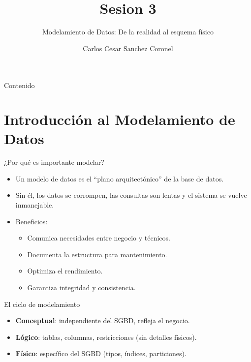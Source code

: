 \documentclass[aspectratio=169, 10pt, xcolor=table]{beamer}
\title[SESION 3 BBDD]{\textbf{Sesion 3}}
\subtitle{Modelamiento de Datos: De la realidad al esquema físico}
\author[Prof. C. Sanchez]{Carlos Cesar Sanchez Coronel}
\institute{\textbf{BASES DE DATOS}}
\date{}
\begin{document}
\begin{frame}
    \titlepage
\end{frame}

\begin{frame}{Contenido}
    \tableofcontents
\end{frame}

\section{Introducción al Modelamiento de Datos}

\begin{frame}{¿Por qué es importante modelar?}
    \begin{itemize}
        \item Un modelo de datos es el ``plano arquitectónico'' de la base de datos.
        \item Sin él, los datos se corrompen, las consultas son lentas y el sistema se vuelve inmanejable.
        \item Beneficios:
        \begin{itemize}
            \item Comunica necesidades entre negocio y técnicos.
            \item Documenta la estructura para mantenimiento.
            \item Optimiza el rendimiento.
            \item Garantiza integridad y consistencia.
        \end{itemize}
    \end{itemize}
\end{frame}

\begin{frame}{El ciclo de modelamiento}
    \centering
    \begin{itemize}
        \item \textbf{Conceptual}: independiente del SGBD, refleja el negocio.
        \item \textbf{Lógico}: tablas, columnas, restricciones (sin detalles físicos).
        \item \textbf{Físico}: específico del SGBD (tipos, índices, particiones).
    \end{itemize}
\end{frame}
\end{document}
